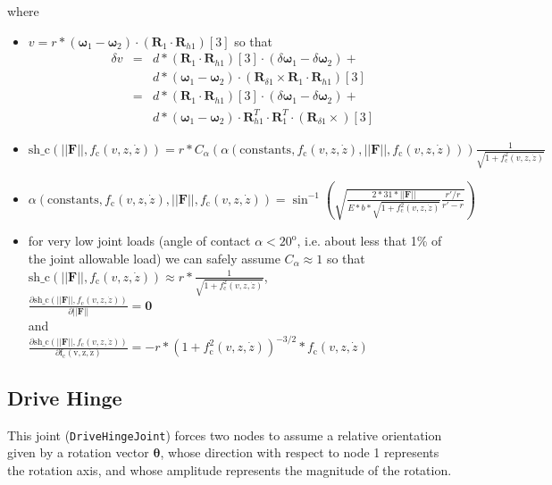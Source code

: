 \documentclass[10pt,dvips,fleqn,subeqn]{report}
\newcommand{\T}[1]{\bm{\mathbf{#1}}}
\begin{document}
where
\begin{itemize}
\item
$v=r * (\T \omega_{1}-\T \omega_{2})\cdot(\T R_1\cdot \T R_{h1})[3]$
so that
\begin{eqnarray*}
\delta v &=& d * (\T R_1\cdot \T R_{h1})[3] \cdot (\delta \T \omega_{1}- \delta \T \omega_{2}) +\\
	&& d * (\T \omega_{1}-\T \omega_{2})\cdot (\T R_{\delta 1} \times \T R_1 \cdot \T R_{h1})[3]\\
	&=& d * (\T R_1\cdot \T R_{h1})[3] \cdot (\delta \T \omega_{1}- \delta \T \omega_{2}) +\\
	&& d * (\T \omega_{1}-\T \omega_{2})\cdot \T R_{h1}^T \cdot \T R_1^T \cdot (\T R_{\delta 1} \times )[3]
\end{eqnarray*}
\item
$
\mathrm{sh\_c}(||\T F||, f_{\mathrm{c}}(v,z,\dot{z}))=
r * 
C_\alpha(
	\alpha(\mathrm{constants},
		f_{\mathrm{c}}(v,z,\dot{z}),
		||\T F||,
		f_{\mathrm{c}}(v,z,\dot{z})
	)
) 
\frac{\displaystyle 1}{\displaystyle \sqrt{1+f_{\mathrm{c}}^2(v,z,\dot{z})}}
$
\item
$
\alpha(\mathrm{constants},
	f_{\mathrm{c}}(v,z,\dot{z}),
	||\T F||,
	f_{\mathrm{c}}(v,z,\dot{z})
) =
\sin^{-1}\left(
	\sqrt{
		\frac{\displaystyle 2*31*||\T F||}
			{\displaystyle E*b*\sqrt{1+f_{\mathrm{c}}^2(v,z,\dot{z})}}
		\frac{\displaystyle r'/r}
			{\displaystyle r'-r}
	}
\right)
$
\item for very low joint loads (angle of contact $\alpha< 20^{\mathrm{o}}$,
i.e. about less that 1\% of the joint allowable load)
we can safely assume $C_\alpha\approx 1$
so that\\ 
$
\mathrm{sh\_c}(||\T F||, f_{\mathrm{c}}(v,z,\dot{z}))\approx
r * 
\frac{\displaystyle 1}{\displaystyle \sqrt{1+f_{\mathrm{c}}^2(v,z,\dot{z})}}
$,\\

$
\frac{\displaystyle\partial \mathrm{sh\_c}(||\T F||, f_{\mathrm{c}}(v,z,\dot{z}))}
	{\displaystyle \partial ||\T F||} = \T 0
$\\
and\\
$
\frac{\displaystyle\partial \mathrm{sh\_c}(||\T F||, f_{\mathrm{c}}(v,z,\dot{z}))}
	{\displaystyle\partial \mathrm{f_{\mathrm{c}}(v,z,\dot{z})}} =
	-r * (1+f_{\mathrm{c}}^2(v,z,\dot{z}))^{-3/2}*f_{\mathrm{c}}(v,z,\dot{z})
$
\end{itemize}




\subsection{Drive Hinge}
This joint (\texttt{DriveHingeJoint}) forces two nodes to assume a relative orientation
given by a rotation vector $\T{\theta}$, whose direction with respect
to node 1 represents the rotation axis, and whose amplitude represents 
the magnitude of the rotation.
\end{document}
